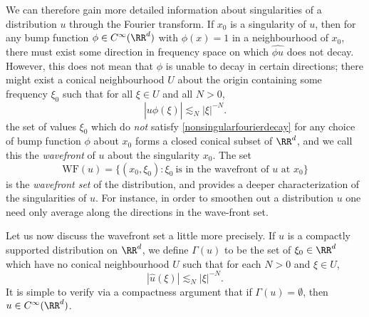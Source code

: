 We can therefore gain more detailed information about singularities of a distribution $u$ through the Fourier transform. If $x_0$ is a singularity of $u$, then for any bump function $\phi \in C^\infty(\RR^d)$ with $\phi(x) = 1$ in a neighbourhood of $x_0$, there must exist some direction in frequency space on which $\widehat{\phi u}$ does not decay. However, this does not mean that $\phi$ is unable to decay in certain directions; there might exist a conical neighbourhood $U$ about the origin containing some frequency $\xi_0$ such that for all $\xi \in U$ and all $N > 0$,
%
\begin{equation} \label{nonsingularfourierdecay}
  |\widehat{u \phi}(\xi)| \lesssim_N |\xi|^{-N}.
\end{equation}
%
the set of values $\xi_0$ which do \emph{not} satisfy \eqref{nonsingularfourierdecay} for any choice of bump function $\phi$ about $x_0$ forms a closed conical subset of $\RR^d$, and we call this the \emph{wavefront} of $u$ about the singularity $x_0$. The set
%
\[ \text{WF}(u) = \{ (x_0,\xi_0) : \xi_0\ \text{is in the wavefront of $u$ at $x_0$} \} \]
%
is the \emph{wavefront set} of the distribution, and provides a deeper characterization of the singularities of $u$. For instance, in order to smoothen out a distribution $u$ one need only average along the directions in the wave-front set.

Let us now discuss the wavefront set a little more precisely. If $u$ is a compactly supported distribution on $\RR^d$, we define $\Gamma(u)$ to be the set of $\xi_0 \in \RR^d$ which have no conical neighbourhood $U$ such that for each $N > 0$ and $\xi \in U$,
%
\begin{equation} \label{fastDecayEquation}
    |\widehat{u}(\xi)| \lesssim_N |\xi|^{-N}.
\end{equation}
%
It is simple to verify via a compactness argument that if $\Gamma(u) = \emptyset$, then $u \in C^\infty(\RR^d)$.

